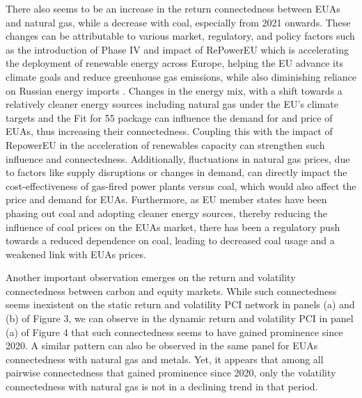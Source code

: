 \documentclass[preprint, 3p,
authoryear]{elsarticle} %
\begin{document}
There also seems to be an increase in the return connectedness between
EUAs and natural gas, while a decrease with coal, especially from 2021
onwards. These changes can be attributable to various market,
regulatory, and policy factors such as the introduction of Phase IV and
impact of RePowerEU which is accelerating the deployment of renewable
energy across Europe, helping the EU advance its climate goals and
reduce greenhouse gas emissions, while also diminishing reliance on
Russian energy imports \citep{repowereu_2024}. Changes in the energy
mix, with a shift towards a relatively cleaner energy sources including
natural gas under the EU's climate targets and the Fit for 55 package
can influence the demand for and price of EUAs, thus increasing their
connectedness. Coupling this with the impact of RepowerEU in the
acceleration of renewables capacity can strengthen such influence and
connectedness. Additionally, fluctuations in natural gas prices, due to
factors like supply disruptions or changes in demand, can directly
impact the cost-effectiveness of gas-fired power plants versus coal,
which would also affect the price and demand for EUAs. Furthermore, as
EU member states have been phasing out coal and adopting cleaner energy
sources, thereby reducing the influence of coal prices on the EUAs
market, there has been a regulatory push towards a reduced dependence on
coal, leading to decreased coal usage and a weakened link with EUAs
prices.

Another important observation emerges on the return and volatility
connectedness between carbon and equity markets. While such
connectedness seems inexistent on the static return and volatility PCI
network in panels (a) and (b) of Figure 3, we can observe in the dynamic
return and volatility PCI in panel (a) of Figure 4 that such
connectedness seems to have gained prominence since 2020. A similar
pattern can also be observed in the same panel for EUAs connectedness
with natural gas and metals. Yet, it appears that among all pairwise
connectedness that gained prominence since 2020, only the volatility
connectedness with natural gas is not in a declining trend in that
period.
\end{document}
